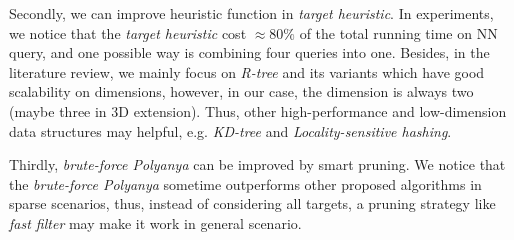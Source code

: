 Secondly, we can improve heuristic function in \textit{target heuristic}.
In experiments, we notice that the \textit{target heuristic} cost $\approx 80\%$ of
the total running time on NN query, and one possible way is combining four queries into one.
Besides, in the literature review, we mainly focus on \textit{R-tree} and its variants which
have good scalability on dimensions, however, in our case, the dimension is always two (maybe
three in 3D extension). Thus, other high-performance and low-dimension data structures may helpful,
e.g. \textit{KD-tree}\cite{ooi1987spatial} and
\textit{Locality-sensitive hashing}\cite{slaney2008locality}.

Thirdly, \textit{brute-force Polyanya} can be improved by smart pruning. We notice that
the \textit{brute-force Polyanya} sometime outperforms other proposed algorithms in sparse scenarios,
thus, instead of considering all targets,
a pruning strategy like \textit{fast filter}\cite{xia2004fast} may make it work in general
scenario.
